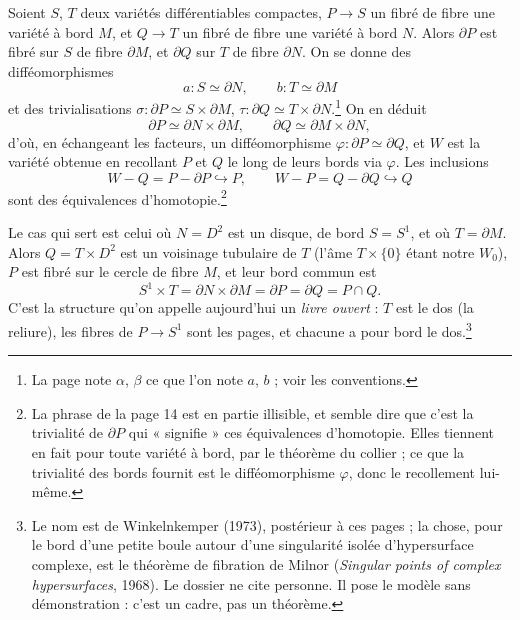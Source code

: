 \documentclass[11pt,a4paper]{article}
\begin{document}
Soient $S$, $T$ deux variétés différentiables compactes, $P \to S$ un fibré de
fibre une variété à bord $M$, et $Q \to T$ un fibré de fibre une variété à
bord $N$. Alors $\partial P$ est fibré sur $S$ de fibre $\partial M$, et
$\partial Q$ sur $T$ de fibre $\partial N$. On se donne des difféomorphismes
\[
  a : S \simeq \partial N, \qquad b : T \simeq \partial M
\]
et des trivialisations $\sigma : \partial P \simeq S \times \partial M$,
$\tau : \partial Q \simeq T \times \partial N$.\footnote{La page note
$\alpha$, $\beta$ ce que l'on note $a$, $b$ ; voir les conventions.} On en
déduit
\[
  \partial P \simeq \partial N \times \partial M, \qquad
  \partial Q \simeq \partial M \times \partial N,
\]
d'où, en échangeant les facteurs, un difféomorphisme
$\varphi : \partial P \simeq \partial Q$, et $W$ est la variété obtenue en
recollant $P$ et $Q$ le long de leurs bords via $\varphi$. Les inclusions
\[
  W - Q = P - \partial P \hookrightarrow P, \qquad
  W - P = Q - \partial Q \hookrightarrow Q
\]
sont des équivalences d'homotopie.\footnote{La phrase de la page 14 est en
partie illisible, et semble dire que c'est la trivialité de $\partial P$ qui
« signifie » ces équivalences d'homotopie. Elles tiennent en fait pour toute
variété à bord, par le théorème du collier ; ce que la trivialité des bords
fournit est le difféomorphisme $\varphi$, donc le recollement lui-même.}

Le cas qui sert est celui où $N = D^{2}$ est un disque, de bord $S = S^{1}$, et
où $T = \partial M$. Alors $Q = T \times D^{2}$ est un voisinage tubulaire de
$T$ (l'âme $T \times \{0\}$ étant notre $W_0$), $P$ est fibré sur le cercle de
fibre $M$, et leur bord commun est
\[
  S^{1} \times T = \partial N \times \partial M = \partial P = \partial Q = P \cap Q .
\]
C'est la structure qu'on appelle aujourd'hui un \emph{livre ouvert} : $T$ est
le dos (la reliure), les fibres de $P \to S^{1}$ sont les pages, et chacune a
pour bord le dos.\footnote{Le nom est de Winkelnkemper (1973), postérieur à ces
pages ; la chose, pour le bord d'une petite boule autour d'une singularité
isolée d'hypersurface complexe, est le théorème de fibration de Milnor
(\emph{Singular points of complex hypersurfaces}, 1968). Le dossier ne cite
personne. Il pose le modèle sans démonstration : c'est un cadre, pas un
théorème.}

\end{document}
